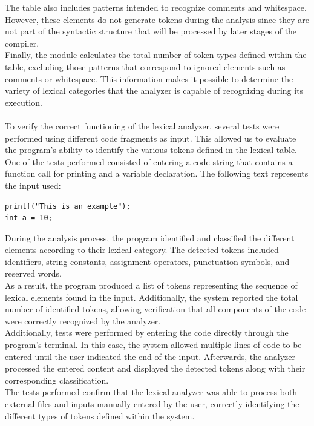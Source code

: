 \documentclass[letterpaper,12pt,oneside]{article}
\begin{document}
The table also includes patterns intended to recognize comments and whitespace. However, these elements do not generate tokens during the analysis since they are not part of the syntactic structure that will be processed by later stages of the compiler. \\
Finally, the module calculates the total number of token types defined within the table, excluding those patterns that correspond to ignored elements such as comments or whitespace. This information makes it possible to determine the variety of lexical categories that the analyzer is capable of recognizing during its execution.\\ \\
To verify the correct functioning of the lexical analyzer, several tests were performed using different code fragments as input. This allowed us to evaluate the program’s ability to identify the various tokens defined in the lexical table. \\
One of the tests performed consisted of entering a code string that contains a function call for printing and a variable declaration. The following text represents the input used: 
\begin{center}
\begin{minipage}{0.5\textwidth} 
\begin{verbatim}
printf("This is an example"); 
int a = 10;
\end{verbatim}
\end{minipage}
\end{center}
During the analysis process, the program identified and classified the different elements according to their lexical category. The detected tokens included identifiers, string constants, assignment operators, punctuation symbols, and reserved words.\\
As a result, the program produced a list of tokens representing the sequence of lexical elements found in the input. Additionally, the system reported the total number of identified tokens, allowing verification that all components of the code were correctly recognized by the analyzer.\\
Additionally, tests were performed by entering the code directly through the program’s terminal. In this case, the system allowed multiple lines of code to be entered until the user indicated the end of the input. Afterwards, the analyzer processed the entered content and displayed the detected tokens along with their corresponding classification. \\
The tests performed confirm that the lexical analyzer was able to process both external files and inputs manually entered by the user, correctly identifying the different types of tokens defined within the system.
\end{document}
